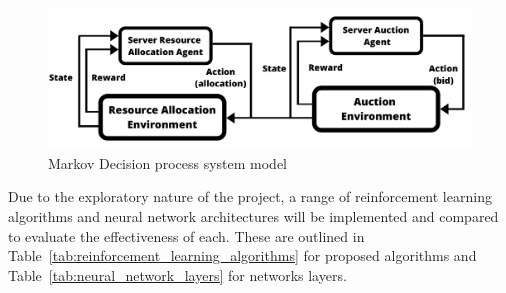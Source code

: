 \begin{figure}[H]
    \centering
    \includegraphics[width=14cm]{figures/3_solution_figs/flexible_resource_allocation_env.pdf}
    \caption{Markov Decision process system model}
    \label{fig:mdp_system_model}
\end{figure}

Due to the exploratory nature of the project, a range of reinforcement learning algorithms and neural network
architectures will be implemented and compared to evaluate the effectiveness of each. These are outlined in
Table~\ref{tab:reinforcement_learning_algorithms} for proposed algorithms and Table~\ref{tab:neural_network_layers} for
networks layers.

